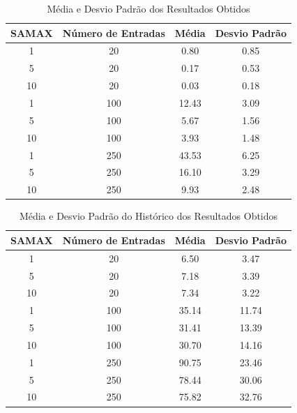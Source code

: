 \documentclass[12pt]{article}
\begin{document}
\begin{table}[H]
\centering
\caption{Média e Desvio Padrão dos Resultados Obtidos}
\begin{tabular}{|c|c|c|c|}
\hline
\textbf{SAMAX} & \textbf{Número de Entradas} & \textbf{Média} & \textbf{Desvio Padrão} \\ \hline
1   & 20 & 0.80 & 0.85 \\ \hline
5   & 20 & 0.17 & 0.53 \\ \hline
10  & 20 & 0.03 & 0.18 \\ \hline
1   & 100 & 12.43 & 3.09 \\ \hline
5   & 100 & 5.67 & 1.56 \\ \hline
10  & 100 & 3.93 & 1.48 \\ \hline
1   & 250 & 43.53 & 6.25 \\ \hline
5   & 250 & 16.10 & 3.29 \\ \hline
10  & 250 & 9.93 & 2.48 \\ \hline

\end{tabular}
\label{tab:resultados}
\end{table}

\begin{table}[H]
  \centering
  \caption{Média e Desvio Padrão do Histórico dos Resultados Obtidos}
  \begin{tabular}{|c|c|c|c|}
    \hline
    \textbf{SAMAX} & \textbf{Número de Entradas} & \textbf{Média} & \textbf{Desvio Padrão} \\ \hline
    1   & 20 & 6.50 & 3.47 \\ \hline
    5   & 20 & 7.18 & 3.39 \\ \hline
    10  & 20 & 7.34 & 3.22 \\ \hline
    1   & 100 & 35.14 & 11.74 \\ \hline
    5   & 100 & 31.41 & 13.39 \\ \hline
    10  & 100 & 30.70 & 14.16 \\ \hline
    1   & 250 & 90.75 & 23.46 \\ \hline
    5   & 250 & 78.44 & 30.06 \\ \hline
    10  & 250 & 75.82 & 32.76 \\ \hline
  
  \end{tabular}
  \label{tab:resultados}
  \end{table}
\end{document}
